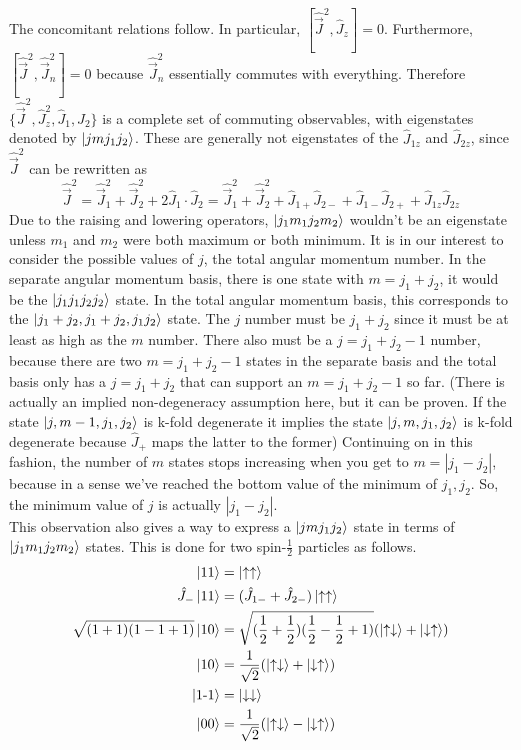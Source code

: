 \documentclass{article}
\begin{document}
The concomitant relations follow. In particular, $[\hat{\vec{J}}^2, \hat{J}_z] = 0$. Furthermore, $[\hat{\vec{J}}^2, \hat{\vec{J}}_n^2] = 0$ because $\hat{\vec{J}}_n^2$ essentially commutes with everything. Therefore $\{\hat{\vec{J}}^2, \hat{J}_z^2, \hat{J}_1, \hat{J}_2\}$ is a complete set of commuting observables, with eigenstates denoted by $\ket{jmj_1j_2}$. These are generally not eigenstates of the $\hat{J}_{1z}$ and $\hat{J}_{2z}$, since $\hat{\vec{J}}^2$ can be rewritten as 
\begin{equation*} \hat{\vec{J}}^2 = \hat{\vec{J}}_1^2 + \hat{\vec{J}}_2^2 + 2\hat{J}_1 \cdot \hat{J}_2 = \hat{\vec{J}}_1^2 + \hat{\vec{J}}_2^2 + \hat{J}_{1+}\hat{J}_{2-} + \hat{J}_{1-}\hat{J}_{2+} + \hat{J}_{1z}\hat{J}_{2z} \end{equation*}
Due to the raising and lowering operators, $\ket{j_1 m_1 j_2 m_2}$ wouldn't be an eigenstate unless $m_1$ and $m_2$ were both maximum or both minimum. It is in our interest to consider the possible values of $j$, the total angular momentum number. In the separate angular momentum basis, there is one state with $m = j_1 + j_2$, it would be the $\ket{j_1j_1j_2j_2}$ state. In the total angular momentum basis, this corresponds to the $\ket{j_1 + j_2, j_1 + j_2, j_1j_2}$ state. The $j$ number must be $j_1 + j_2$ since it must be at least as high as the $m$ number. There also must be a $j=j_1 + j_2 - 1$ number, because there are two $m=j_1 + j_2 - 1$ states in the separate basis and the total basis only has a $j=j_1 + j_2$ that can support an $m=j_1 + j_2  - 1$ so far. (There is actually an implied non-degeneracy assumption here, but it can be proven. If the state $\ket{j,m-1,j_1,j_2}$ is k-fold degenerate it implies the state $\ket{j, m, j_1, j_2}$ is k-fold degenerate because $\hat{J}_+$ maps the latter to the former) Continuing on in this fashion, the number of $m$ states stops increasing when you get to $m= |j_1 - j_2|$, because in a sense we've reached the bottom value of the minimum of $j_1,j_2$. So, the minimum value of $j$ is actually $|j_1 - j_2|$. \\
This observation also gives a way to express a $\ket{jmj_1j_2}$ state in terms of $\ket{j_1m_1j_2m_2}$ states. This is done for two spin-$\frac{1}{2}$ particles as follows. 
\begin{align*}
\ket{11} &= \ket{\uparrow\uparrow} \\
\hat{J}_-\ket{11} &= (\hat{J}_{1-} + \hat{J}_{2-})\ket{\uparrow\uparrow} \\
\sqrt{(1+1)(1-1+1)}\ket{10} &= \sqrt{(\frac{1}{2}+\frac{1}{2})(\frac{1}{2}-\frac{1}{2}+1)}(\ket{\uparrow\downarrow} + \ket{\downarrow\uparrow}) \\
\ket{10} &= \frac{1}{\sqrt{2}}(\ket{\uparrow\downarrow} + \ket{\downarrow\uparrow}) \\
\ket{1\text{-}1} &= \ket{\downarrow\downarrow} \\
\ket{00} &= \frac{1}{\sqrt{2}}(\ket{\uparrow\downarrow} - \ket{\downarrow\uparrow})
\end{align*}
\end{document}
